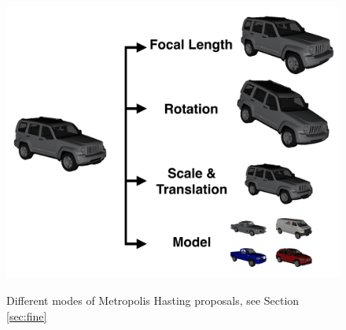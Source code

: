 \documentclass[10pt,twocolumn,letterpaper]{article}
\begin{document}

\begin{figure}[t]
\centering
    \includegraphics[width=0.7\linewidth]{tuning2} \\ [-5pt]
    \caption{Different modes of Metropolis Hasting proposals, see Section \ref{sec:fine}}
 \label{fig:tuningmode}
\end{figure}
    
\end{document}
